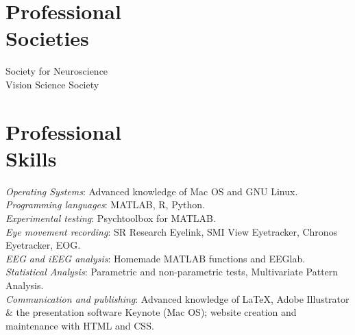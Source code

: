 \documentclass[margin,line]{resume}
\begin{document}
\begin{resume}
	
	\vspace{3mm}
	\section{\mysidestyle Professional\\Societies}
	Society for Neuroscience\\
	Vision Science Society
	




	\vspace{3mm}
    \section{\mysidestyle Professional\\Skills}
	\textsl{Operating Systems}: Advanced knowledge of Mac OS and GNU Linux.\\
	\textsl{Programming languages}: MATLAB, R, Python.\\
	\textsl{Experimental testing}: Psychtoolbox for MATLAB.\\
	\textsl{Eye movement recording}: SR Research Eyelink, SMI View Eyetracker, Chronos Eyetracker, EOG.\\
	\textsl{EEG and iEEG analysis}: Homemade MATLAB functions and EEGlab.\\
	\textsl{Statistical Analysis}: Parametric and non-parametric tests, Multivariate Pattern Analysis.\\
	\textsl{Communication and publishing}: Advanced knowledge of \LaTeX, Adobe Illustrator \& the presentation software Keynote (Mac OS); website creation and maintenance with HTML and CSS.



\end{resume}
\end{document}
